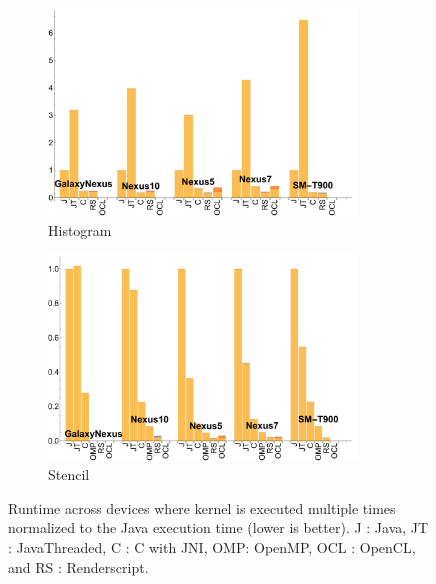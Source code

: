 \begin{figure}[t]
  \begin{subfigure}[b]{0.5\textwidth}
      \centering
      \includegraphics[width=0.9\textwidth]{data/Histogram_time.pdf}
      \caption{Histogram}\label{fig:histo}
  \end{subfigure}
  \begin{subfigure}[b]{0.5\textwidth}
      \centering
      \includegraphics[width=0.9\textwidth]{data/Stencil_time.pdf}
      \caption{Stencil}
      \label{fig:Stencil}
  \end{subfigure}

  \caption{Runtime across devices where kernel is executed multiple times normalized to the Java execution time (lower is better). J : Java, JT : JavaThreaded, C : C with JNI, OMP: OpenMP, OCL : OpenCL, and RS : Renderscript.}
\end{figure}
\FloatBarrier
